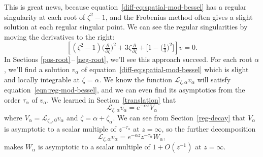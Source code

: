 \documentclass{article}
\theoremstyle{definition}
\newcommand{\fracderiv}[3]{\partial^{#1}_{#2, #3}}
\newcommand{\laplace}{\mathcal{L}}
\theoremstyle{plain}
\begin{document}
This is great news, because equation~\eqref{diff-eq:spatial-mod-bessel} has a regular singularity at each root of $\zeta^2 - 1$, and the Frobenius method often gives a slight solution at each regular singular point. We can see the regular singularities by moving the derivatives to the right:
\[ \left[ (\zeta^2 - 1) \big(\tfrac{\partial}{\partial \zeta}\big)^2 + 3\zeta \tfrac{\partial}{\partial \zeta} + \big[ 1 - \big(\tfrac{1}{3}\big)^2 \big] \right] v = 0. \]
In Sections \ref{pos-root}\,--\,\ref{neg-root}, we’ll see this approach succeed. For each root $\alpha$, we'll find a solution $v_\alpha$ of equation~\eqref{diff-eq:spatial-mod-bessel} which is slight and locally integrable at $\zeta = \alpha$. We know the function $\laplace_{\zeta, \alpha} v_\alpha$ will satisfy equation~\eqref{eqn:reg-mod-bessel}, and we can even find its asymptotics from the order $\tau_\alpha$ of $v_\alpha$. We learned in Section~\ref{translation} that
\[ \laplace_{\zeta, \alpha} v_\alpha = e^{-\alpha z} V_\alpha \]
where $V_\alpha = \laplace_{\zeta_\alpha, 0} v_\alpha$ and $\zeta = \alpha + \zeta_\alpha$. We can see from Section~\ref{reg-decay} that $V_\alpha$ is asymptotic to a scalar multiple of $z^{ - \tau_\alpha}$ at $z = \infty$, so the further decomposition
\[ \laplace_{\zeta, \alpha} v_\alpha = e^{-\alpha z} z^{-\tau_\alpha} W_\alpha, \]
makes $W_\alpha$ is asymptotic to a scalar multiple of $1+O(z^{-1})$ at $z = \infty$.
\end{document}
